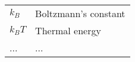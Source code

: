 \begin{abbreviations}


\begin{table}[here]
\centering
\begin{tabular}{ll}
$k_{B}$  & Boltzmann's constant \\
$k_{B}T$ & Thermal energy \\
...      & ... \\
\end{tabular} 
\label{tbl:Abbreviations}
\end{table}


\end{abbreviations}
